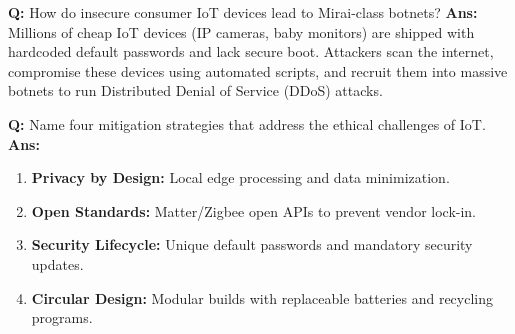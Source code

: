 \documentclass[10pt,a4paper,twocolumn]{article}
\begin{document}
\begin{tcolorbox}[
  colback=white,
  colframe=UnitColorTen,
  colbacktitle=gray!10!white,
  coltitle=black,
  fonttitle=\bfseries\sffamily\small,
  title={Unit X $\bullet$ Card 9},
  boxrule=1.2pt,
  arc=2mm,
  outer arc=2mm,
  boxsep=1.5mm,
  top=1mm,
  bottom=1mm,
  left=1.5mm,
  right=1.5mm,
  before skip=2.5mm,
  after skip=2.5mm
]
\textbf{Q:} How do insecure consumer IoT devices lead to Mirai-class botnets?
\tcbline
\textbf{Ans:} Millions of cheap IoT devices (IP cameras, baby monitors) are shipped with hardcoded default passwords and lack secure boot. Attackers scan the internet, compromise these devices using automated scripts, and recruit them into massive botnets to run Distributed Denial of Service (DDoS) attacks.
\end{tcolorbox}


\begin{tcolorbox}[
  colback=white,
  colframe=UnitColorTen,
  colbacktitle=gray!10!white,
  coltitle=black,
  fonttitle=\bfseries\sffamily\small,
  title={Unit X $\bullet$ Card 10},
  boxrule=1.2pt,
  arc=2mm,
  outer arc=2mm,
  boxsep=1.5mm,
  top=1mm,
  bottom=1mm,
  left=1.5mm,
  right=1.5mm,
  before skip=2.5mm,
  after skip=2.5mm
]
\textbf{Q:} Name four mitigation strategies that address the ethical challenges of IoT.
\tcbline
\textbf{Ans:} \begin{enumerate}
  \item \textbf{Privacy by Design:} Local edge processing and data minimization.
  \item \textbf{Open Standards:} Matter/Zigbee open APIs to prevent vendor lock-in.
  \item \textbf{Security Lifecycle:} Unique default passwords and mandatory security updates.
  \item \textbf{Circular Design:} Modular builds with replaceable batteries and recycling programs.
\end{enumerate}
\end{tcolorbox}
\end{document}
